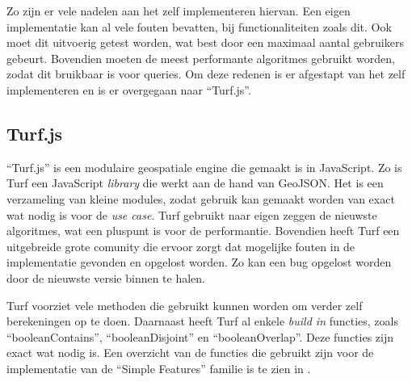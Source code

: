 Zo zijn er vele nadelen aan het zelf implementeren hiervan. Een eigen implementatie kan al vele fouten bevatten, bij functionaliteiten zoals dit. Ook moet dit uitvoerig getest worden, wat best door een maximaal aantal gebruikers gebeurt. Bovendien moeten de meest performante algoritmes gebruikt worden, zodat dit bruikbaar is voor queries. Om deze redenen is er afgestapt van het zelf implementeren en is er overgegaan naar ``Turf.js''.

\subsection{Turf.js}
``Turf.js'' is een modulaire geospatiale engine die gemaakt is in JavaScript. Zo is Turf een JavaScript \textit{library} die werkt aan de hand van GeoJSON. Het is een verzameling van kleine modules, zodat gebruik kan gemaakt worden van exact wat nodig is voor de \textit{use case}. Turf gebruikt naar eigen zeggen de nieuwste algoritmes, wat een pluspunt is voor de performantie. Bovendien heeft Turf een uitgebreide grote comunity die ervoor zorgt dat mogelijke fouten in de implementatie gevonden en opgelost worden. Zo kan een bug opgelost worden door de nieuwste versie binnen te halen.

Turf voorziet vele methoden die gebruikt kunnen worden om verder zelf berekeningen op te doen. Daarnaast heeft Turf al enkele \textit{build in} functies, zoals ``booleanContains'', ``booleanDisjoint'' en ``booleanOverlap''. Deze functies zijn exact wat nodig is. Een overzicht van de functies die gebruikt zijn voor de implementatie van de ``Simple Features'' familie is te zien in .

